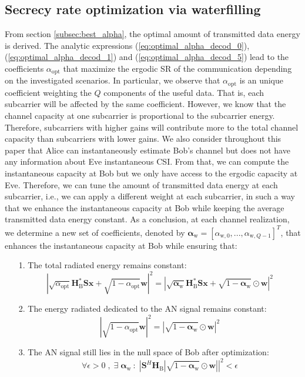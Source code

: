 \documentclass[journal,comsoc]{IEEEtran}
\newcommand{\module}[1]{\left|#1\right|}
\newcommand{\HB}{\textbf{H}_{\text{B}}}
\newcommand{\spread}{\textbf{S}}
\newcommand{\w}{\textbf{w}}
\begin{document}
\subsection{Secrecy rate optimization via waterfilling}
\label{subsec:perf_waterf}
From section \ref{subsec:best_alpha}, the optimal amount of transmitted data energy is derived. The analytic expressions (\ref{eq:optimal_alpha_decod_0}), (\ref{eq:optimal_alpha_decod_1}) and (\ref{eq:optimal_alpha_decod_5}) lead to the coefficients $\alpha_{\text{opt}}$ that maximize the ergodic SR of the communication depending on the investigated scenarios.
In particular, we observe that $\alpha_{\text{opt}}$ is an unique coefficient weighting the $Q$ components of the useful data. That is, each subcarrier will be affected by the same coefficient. However, we know that the channel capacity at one subcarrier is proportional to the subcarrier energy. Therefore, subcarriers with higher gains will contribute more to the total channel capacity than subcarriers with lower gains. We also consider throughout this paper that Alice can instantaneously estimate Bob's channel but does not have any information about Eve instantaneous CSI. From that, we can compute the instantaneous capacity at Bob but we only have access to the ergodic capacity at Eve. Therefore, we can tune the amount of transmitted data energy at each subcarrier, i.e., we can apply a different weight at each subcarrier, in such a way that we enhance the instantaneous capacity at Bob while keeping the average transmitted data energy constant. As a conclusion, at each channel realization, we determine a new set of coefficients, denoted by $\boldsymbol\alpha_{\text{w}} = [\alpha_{\text{w},0},...,\alpha_{\text{w},Q-1}]^T $, that enhances the instantaneous capacity at Bob while ensuring that:
\begin{itemize}
	\item[1.] The total radiated energy remains constant:
	\begin{equation}
	\module{\sqrt{\alpha_{\text{opt}}} \HB^* \spread \textbf{x} + \sqrt{1-\alpha_{\text{opt}}}  \w }^2  =   \module{\sqrt{\boldsymbol\alpha_{\text{w}}}  \HB^* \spread \textbf{x} + \sqrt{1-\boldsymbol\alpha_{\text{w}}} \odot  \w }^2
	\end{equation}
	\item[2.] The energy radiated dedicated to the AN signal remains constant:
	\begin{equation}
	\module{\sqrt{1-\alpha_{\text{opt}}}\w}^2 = \module{\sqrt{1-\boldsymbol\alpha_{\text{w}}} \odot\w}^2
	\end{equation}
	\item[3.] The AN signal still lies in the null space of Bob after optimization:
	\begin{equation}
	\forall \epsilon > 0 \; , \; \exists \;  \boldsymbol\alpha_{\text{w}} \: : \; \left|\spread^H \HB \left| \sqrt{1-\boldsymbol\alpha_{\text{w}}}\odot \w \right| \right|^2 < \epsilon
	\end{equation}
\end{itemize}
\end{document}
